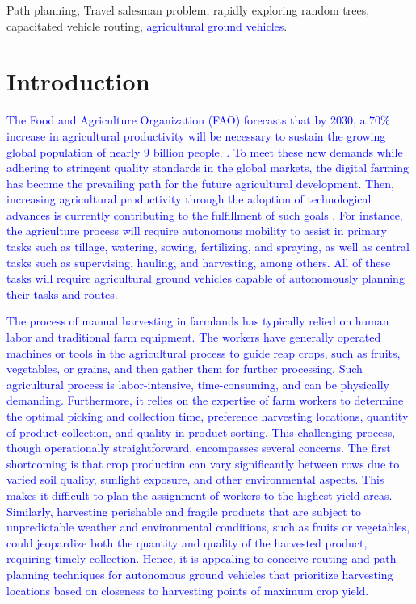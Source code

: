 \documentclass[conference]{IEEEtran}
\newcommand{\revL}[1]{\textcolor{blue}{#1}}
\begin{document}
\begin{IEEEkeywords}
Path planning, Travel salesman problem, rapidly exploring random trees, capacitated vehicle routing, \revL{agricultural ground vehicles}.
\end{IEEEkeywords}

\section{Introduction}
\textcolor{blue}{The Food and Agriculture Organization (FAO) forecasts that by 2030, a 70\% increase in agricultural productivity will be necessary to sustain the growing global population of nearly 9 billion people. \cite{FAO2050}. To meet these new demands while adhering to stringent quality standards in the global markets, the digital farming has become the prevailing path for the future agricultural development. Then, increasing agricultural productivity through the adoption of technological advances is currently contributing to the fulfillment of such goals \cite{Prado2018}. For instance, the agriculture process will require autonomous mobility to assist in primary tasks such as tillage, watering, sowing, fertilizing, and spraying, as well as central tasks such as supervising, hauling, and harvesting, among others. All of these tasks will require agricultural ground vehicles capable of autonomously planning their tasks and routes}.

\textcolor{blue}{The process of manual harvesting in farmlands has typically relied on human labor and traditional farm equipment. The workers have generally operated machines or tools in the agricultural process to guide reap crops, such as fruits, vegetables, or grains, and then gather them for further processing. Such agricultural process is labor-intensive, time-consuming, and can be physically demanding. Furthermore, it relies on the expertise of farm workers to determine the optimal picking and collection time, preference harvesting locations, quantity of product collection, and quality in product sorting. This challenging process, though operationally straightforward, encompasses several concerns. The first shortcoming is that crop production can vary significantly between rows due to varied soil quality, sunlight exposure, and other environmental aspects. This makes it difficult to plan the assignment of workers to the highest-yield areas. Similarly, harvesting perishable and fragile products that are subject to unpredictable weather and environmental conditions, such as fruits or vegetables, could jeopardize both the quantity and quality of the harvested product, requiring timely collection. Hence, it is appealing to conceive routing and path planning techniques for autonomous ground vehicles that prioritize harvesting locations based on closeness to harvesting points of maximum crop yield.}
\end{document}
